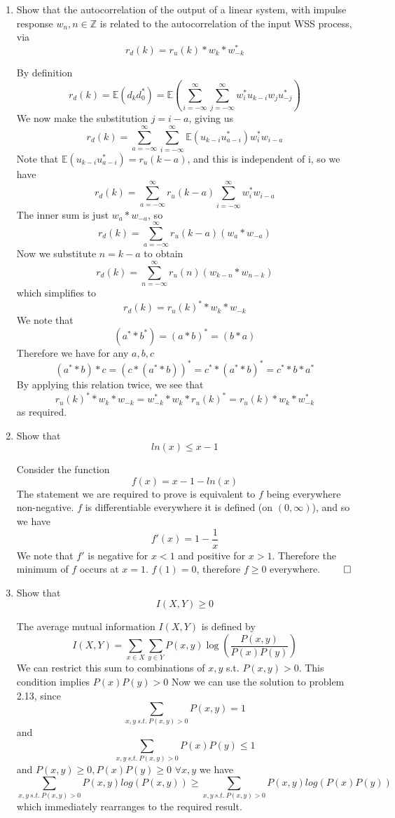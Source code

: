 \documentclass{article}
\newcommand{\chapternumber}{2}
\newenvironment{QandA}{\begin{enumerate}[label=\chapternumber.\arabic*]\bfseries\boldmath}
	{\end{enumerate}}
\newenvironment{answered}{\par\bigskip\normalfont\unboldmath}{}
\begin{document}
\begin{QandA}
\begin{answered}
	\end{answered}

	\item Show that the autocorrelation of the output of a linear system, with impulse response $w_n,n\in\mathbb{Z}$ is related to the autocorrelation of the input WSS process, via
	\[r_d(k)=r_u(k)* w_k* w^*_{-k}\]
	\begin{answered}
		By definition
		\[r_d(k)=\mathbb{E}(d_kd_0^*)=\mathbb{E}\left(\sum_{i=-\infty}^{\infty}\sum_{j=-\infty}^{\infty}w_i^*u_{k-i}w_ju_{-j}^*\right)\]
		We now make the substitution $j=i-a$, giving us
		\[r_d(k)=\sum_{a=-\infty}^{\infty}\sum_{i=-\infty}^{\infty}\mathbb{E}(u_{k-i}u_{a-i}^*)w_i^*w_{i-a}\]
		Note that $\mathbb{E}(u_{k-i}u_{a-i}^*)=r_u(k-a)$, and this is independent of i, so we have
		\[r_d(k)=\sum_{a=-\infty}^{\infty}r_u(k-a)\sum_{i=-\infty}^{\infty}w_i^*w_{i-a}\]
		The inner sum is just $w_a*w_{-a}$, so
		\[r_d(k)=\sum_{a=-\infty}^{\infty}r_u(k-a)(w_a*w_{-a})\]
		Now we substitute $n=k-a$ to obtain
		\[r_d(k)=\sum_{n=-\infty}^{\infty}r_u(n)(w_{k-n}*w_{n-k})\]
		which simplifies to
		\[r_d(k)=r_u
		(k)^**w_k*w_{-k}\]
		We note that 
		\[(a^**b^*)=(a*b)^*=(b*a)\]
		Therefore we have for any $a,b,c$
		\[(a^**b)*c=(c*(a^**b))^*=c^**(a^**b)^*=c^**b*a^*\]
		By applying this relation twice, we see that
		\[r_u
		(k)^**w_k*w_{-k}=w_{-k}^**w_k*r_u(k)^*=r_u
		(k)*w_k*w_{-k}^*\]
		as required.
	\end{answered}

	\item Show that 
	\[ln(x)\leq x-1\]
	\begin{answered}
		Consider the function \[f(x)=x-1-ln(x)\]The statement we are required to prove is equivalent to $f$ being everywhere non-negative. $f$ is differentiable everywhere it is defined (on $(0,\infty)$), and so we have
		\[f'(x)=1-\frac{1}{x}\]
		We note that $f'$ is negative for $x<1$ and positive for $x>1$. Therefore the minimum of $f$ occurs at $x=1$. $f(1)=0$, therefore $f\geq0$ everywhere. $\qed$		
	\end{answered}

	\item Show that 
	\[I(X,Y)\geq 0\]
	\begin{answered}
		The average mutual information $I(X,Y)$ is defined by
		\[I(X,Y)=\sum_{x\in X}\sum_{y\in Y}P(x,y)\log\left(\frac{P(x,y)}{P(x)P(y)}\right)\]
		We can restrict this sum to combinations of $x,y$ s.t. $P(x,y)>0$. This condition implies $P(x)P(y)>0$
		Now we can use the solution to problem 2.13, since 
		\[\sum_{x,y\ s.t.\ P(x,y)>0}P(x,y)=1\]
		and
		\[\sum_{x,y\ s.t.\ P(x,y)>0}P(x)P(y)\leq1\]
		and $P(x,y)\geq 0,P(x)P(y)\geq0$ $\forall x,y$
		we have
		\[\sum_{x,y\ s.t.\ P(x,y)>0}P(x,y)log(P(x,y))\geq \sum_{x,y\ s.t.\ P(x,y)>0}P(x,y)log(P(x)P(y))\]
		which immediately rearranges to the required result.
	\end{answered}


\end{QandA}
\end{document}
